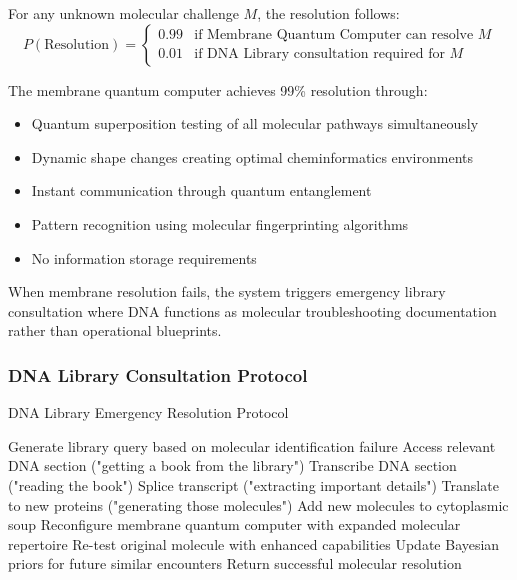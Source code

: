 \documentclass[11pt,a4paper]{article}
\begin{document}
\begin{definition}
For any unknown molecular challenge $M$, the resolution follows:
\begin{equation}
P(\text{Resolution}) = \begin{cases}
0.99 & \text{if Membrane Quantum Computer can resolve } M \\
0.01 & \text{if DNA Library consultation required for } M
\end{cases}
\end{equation}
\end{definition}

The membrane quantum computer achieves 99\% resolution through:
\begin{itemize}
\item Quantum superposition testing of all molecular pathways simultaneously
\item Dynamic shape changes creating optimal cheminformatics environments  
\item Instant communication through quantum entanglement
\item Pattern recognition using molecular fingerprinting algorithms
\item No information storage requirements
\end{itemize}

When membrane resolution fails, the system triggers emergency library consultation where DNA functions as molecular troubleshooting documentation rather than operational blueprints.

\subsubsection{DNA Library Consultation Protocol}

\begin{algorithm}
\caption{DNA Library Emergency Resolution Protocol}
\begin{algorithmic}
    \State Generate library query based on molecular identification failure
    \State Access relevant DNA section ("getting a book from the library")
    \State Transcribe DNA section ("reading the book")
    \State Splice transcript ("extracting important details")
    \State Translate to new proteins ("generating those molecules")
    \State Add new molecules to cytoplasmic soup
    \State Reconfigure membrane quantum computer with expanded molecular repertoire
    \State Re-test original molecule with enhanced capabilities
    \State Update Bayesian priors for future similar encounters
    \State Return successful molecular resolution
\EndProcedure
\end{algorithmic}
\end{algorithm}
\end{document}
